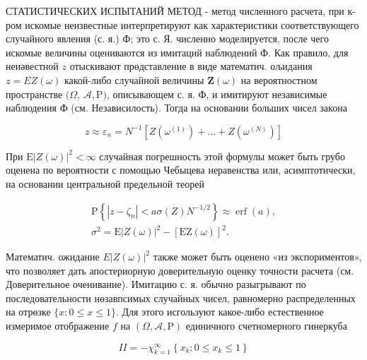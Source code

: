 \documentclass[10pt]{article}
\begin{document}
СТАТИСТИЧЕСКИХ ИСПЫТАНИЙ МЕТОД - метод численного расчета, при к-ром искомые неизвестные интерпретируют как характеристики соответствующего случайного явления (с. я.) Ф; это с. Я. численно моделируется, после чего искомые величины оцениваются из имитаций наблюдений Ф. Как правило, для неиәвестной $z$ отыскивают прөдставление в виде математич. ољидания $z=E Z(\omega)$ какой-либо случайной величины $\boldsymbol{Z}(\omega)$ на вероятностном пространстве $(\Omega$, $\mathcal{A}, \mathrm{P})$, описывающем с. я. Ф, и имитируют независимые наблюдения Ф (см. Независилость). Тогда на основании больших чисел закона



\[

z \approx \varepsilon_{n}=N^{-1}\left[Z\left(\omega^{(1)}\right)+\ldots+Z\left(\omega^{(N)}\right)\right]

\]



При $\mathrm{E}|Z(\omega)|^{2}<\infty$ случайная погрешность этой формулы может быть грубо оценена по вероятности с помощью Чебыцева неравенства или, асимптотически, на основании центральной предельной теорей



\[

\begin{gathered}

\mathrm{P}\left\{\left|z-\zeta_{n}\right|<a \sigma(Z) N^{-1 / 2}\right\} \approx \operatorname{erf}(a), \\

\sigma^{2}=\mathrm{E}|Z(\omega)|^{2}-[\mathrm{EZ}(\omega)]^{2} .

\end{gathered}

\]



Математич. ожидание $E|Z(\omega)|^{2}$ также может быть оценено «из экспориментов», что позволяет дать апостериорную доверительную оценку точности расчета (см. Доверительное оченивание). Имитацию с. я. обычно разыгрывают по последовательности нөзавпсимых случайных чисел, равномерно распределенных на отрөзке $\{x: 0 \leqslant x \leqslant 1\}$. Для этого исгользуют какое-либо естественное измеримое отображение $f$ на $(\Omega, \mathcal{A}, \mathrm{P})$ единичного счетномерного гинеркуба



\[

I I=-\chi_{k=1}^{\infty}\left\{x_{k}: 0 \leqslant x_{k} \leqslant 1\right\}

\]
\end{document}
